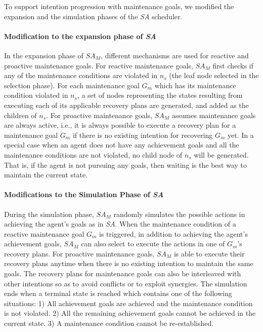 \documentclass[a0, portrait]{a0poster}
\newcommand{\SA}{\emph{SA}\xspace}
\newcommand{\SAM}{\emph{$SA_M$}\xspace}
\begin{document}
\begin{multicols}{3}
To support intention progression with maintenance goals, we modified the expansion and the simulation phases of the \SA scheduler.
%
\paragraph*{Modification to the expansion phase of \SA}
%
In the expansion phase of \SAM, different mechanisms are used for reactive and proactive maintenance goals.
%
For reactive maintenance goals, \SAM first checks if any of the maintenance conditions are violated in $n_s$ (the leaf node selected in the selection phase).
%
For each maintenance goal $G_m$ which has its maintenance condition violated in $n_s$,
a set of nodes representing the states resulting from executing each of its applicable recovery plans are generated, and added as the children of $n_s$.
%
%
For proactive maintenance goals, \SAM assumes maintenance goals are always active, i.e., it is always possible to execute a recovery plan for a maintenance goal $G_m$ if there is no existing intention for recovering $G_m$ yet.
%
In a special case when an agent does not have any achievement goals and all the maintenance conditions are not violated, no child node of $n_s$ will be generated. That is, if the agent is not pursuing any goals, then waiting is the best way to maintain the current state.
%
\paragraph{\textbf{Modifications to the Simulation Phase of \SA}}
During the simulation phase, \SAM randomly simulates the possible actions in achieving the agent's goals as in \SA. When the maintenance condition of a reactive maintenance goal $G_m$ is triggered, in addition to achieving the agent's achievement goals, \SAM can also select to execute the actions in one of $G_m$'s recovery plans.
%
For proactive maintenance goals, \SAM is able to execute their recovery plans anytime when there is no existing intention to maintain the same goals. The recovery plans for maintenance goals can also be interleaved with other intentions so as to avoid conflicts or to exploit synergies. %
%
The simulation ends when a terminal state is reached which contains one of the following situations:
1) All achievement goals are achieved and the maintenance condition is not violated.
2) All the remaining achievement goals cannot be achieved in the current state.
3) A maintenance condition cannot be re-established.



\end{multicols}
\end{document}

